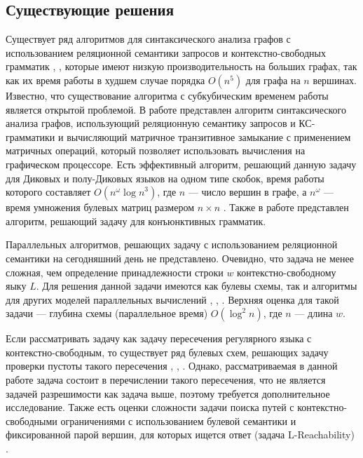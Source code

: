 \documentclass{spbau-diploma}
\begin{document}
\subsection{Существующие решения}
Существует ряд алгоритмов для синтаксического анализа графов с использованием реляционной семантики запросов и контекстно-свободных грамматик \cite{HellingsCFPQ}, \cite{MatrixMult}, которые имеют низкую производительность на больших графах, так как их время работы в худшем случае порядка $O(n^5)$ для графа на $n$ вершинах. Известно, что существование алгоритма с субкубическим временем работы является открытой проблемой. В работе \cite{MatrixMult} представлен алгоритм синтаксического анализа графов, использующий реляционную семантику запросов и КС-грамматики и вычисляющий матричное транзитивное замыкание с применением матричных операций, который позволяет использовать вычисления на графическом процессоре. Есть эффективный алгоритм, решающий данную задачу для Диковых и полу-Диковых языков на одном типе скобок, время работы которого составляет $O(n^{\omega}{\log{n}}^3)$, где $n$ ---  число вершин в графе, а $n^{\omega}$ --- время умножения булевых матриц размером $n \times n$ \cite{Bradford}. Также в работе \cite{ConjPath} представлен алгоритм, решающий задачу для конъюнктивных грамматик.
\par
Параллельных алгоритмов, решающих задачу с использованием реляционной семантики на сегодняшний день не представлено. Очевидно, что задача не менее сложная, чем определение принадлежности строки $w$ контекстно-свободному яыку $L$. Для решения данной задачи имеются как булевы схемы, так и алгоритмы для других моделей параллельных вычислений \cite{Brent}, \cite{Ruzzo}, \cite{Rytter}. Верхняя оценка для такой задачи --- глубина схемы (параллельное время) $O(\log^2 n)$, где $n$ --- длина $w$.
\par
Если рассматривать задачу как задачу пересечения регулярного языка с контекстно-свободным, то существует ряд булевых схем, решающих задачу проверки пустоты такого пересечения \cite{Lohrey}, \cite{Regularrealizability}, \cite{Swernofsky2015OnTC}. Однако, рассматриваемая в данной работе задача состоит в перечислении такого пересечения, что не является задачей разрешимости как задача выше, поэтому требуется дополнительное исследование. Также есть оценки сложности задачи поиска путей с контекстно-свободными ограничениями с использованием булевой семантики и фиксированной парой вершин, для которых ищется ответ (задача L-Reachability) \cite{LReach}.
\end{document}
